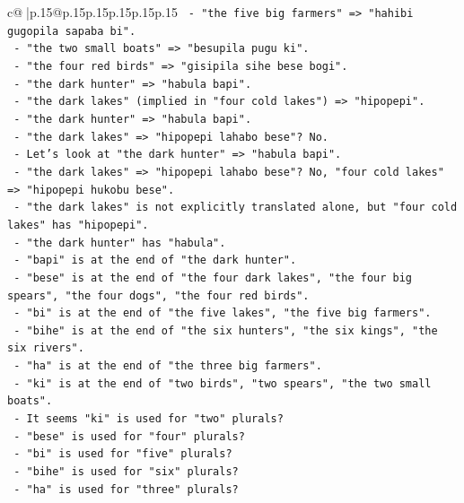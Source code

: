\documentclass{article}
\begin{document}
{\begin{supertabular}{c@{$\;$}|p{.15\linewidth}@{}p{.15\linewidth}p{.15\linewidth}p{.15\linewidth}p{.15\linewidth}p{.15\linewidth}}
{{{\texttt{           {-} "the five big farmers" => "hahibi gugopila sapaba bi".} \\
\texttt{           {-} "the two small boats" => "besupila pugu ki".} \\
\texttt{           {-} "the four red birds" => "gisipila sihe bese bogi".} \\
\texttt{           {-} "the dark hunter" => "habula bapi".} \\
\texttt{           {-} "the dark lakes" (implied in "four cold lakes") => "hipopepi".} \\
\texttt{           {-} "the dark hunter" => "habula bapi".} \\
\texttt{           {-} "the dark lakes" => "hipopepi lahabo bese"? No.} \\
\texttt{           {-} Let's look at "the dark hunter" => "habula bapi".} \\
\texttt{           {-} "the dark lakes" => "hipopepi lahabo bese"? No, "four cold lakes" => "hipopepi hukobu bese".} \\
\texttt{           {-} "the dark lakes" is not explicitly translated alone, but "four cold lakes" has "hipopepi".} \\
\texttt{           {-} "the dark hunter" has "habula".} \\
\texttt{           {-} "bapi" is at the end of "the dark hunter".} \\
\texttt{           {-} "bese" is at the end of "the four dark lakes", "the four big spears", "the four dogs", "the four red birds".} \\
\texttt{           {-} "bi" is at the end of "the five lakes", "the five big farmers".} \\
\texttt{           {-} "bihe" is at the end of "the six hunters", "the six kings", "the six rivers".} \\
\texttt{           {-} "ha" is at the end of "the three big farmers".} \\
\texttt{           {-} "ki" is at the end of "two birds", "two spears", "the two small boats".} \\
\texttt{           {-} It seems "ki" is used for "two" plurals?} \\
\texttt{           {-} "bese" is used for "four" plurals?} \\
\texttt{           {-} "bi" is used for "five" plurals?} \\
\texttt{           {-} "bihe" is used for "six" plurals?} \\
\texttt{           {-} "ha" is used for "three" plurals?} \\
}}}
\end{supertabular}}
\end{document}
